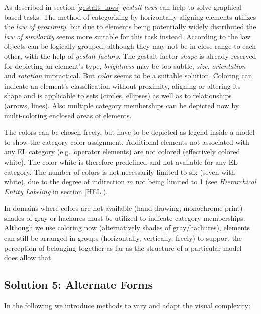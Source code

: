 \documentclass[twoside, openright, 12pt]{book}
\begin{document}
As described in section \ref{gestalt_laws} \textit{gestalt laws} can help to solve graphical-based tasks.
The method of categorizing by horizontally aligning elements utilizes the \textit{law of proximity}, but due to elements being potentially widely distributed the \textit{law of similarity} seems more suitable for this task instead.
According to the law objects can be logically grouped, although they may not be in close range to each other, with the help of \textit{gestalt factors}.
The gestalt factor \textit{shape} is already reserved for depicting an element's type, \textit{brightness} may be too subtle, \textit{size}, \textit{orientation} and \textit{rotation} impractical.
But \textit{color} seems to be a suitable solution.
Coloring can indicate an element's classification without proximity, aligning or altering its shape and is applicable to sets (circles, ellipses) as well as to relationships (arrows, lines).
Also multiple category memberships can be depicted now by multi-coloring enclosed areas of elements.

The colors can be chosen freely, but have to be depicted as legend inside a model to show the category-color assignment.
Additional elements not associated with any EL category (e.g.\ operator elements) are not colored (effectively colored white).
The color white is therefore predefined and not available for any EL category.
The number of colors is not necessarily limited to six (seven with white), due to the degree of indirection $m$ not being limited to 1 (see \textit{Hierarchical Entity Labeling} in section \ref{HEL}).

In domains where colors are not available (hand drawing, monochrome print) shades of gray or hachures must be utilized to indicate category memberships.
Although we use coloring now (alternatively shades of gray/hachures), elements can still be arranged in groups (horizontally, vertically, freely) to support the perception of belonging together as far as the structure of a particular model does allow that.



\subsection{Solution 5: Alternate Forms}
\label{solution_alternate_forms}
In the following we introduce methods to vary and adapt the visual complexity:
\end{document}
